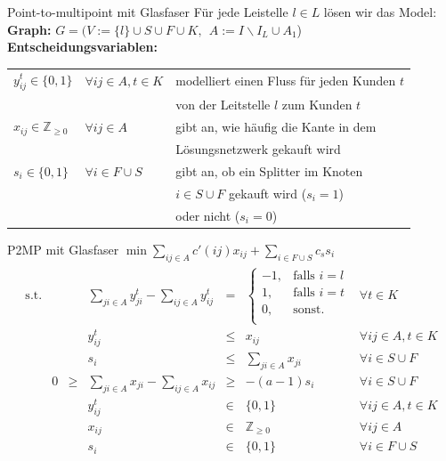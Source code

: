 \documentclass{beamer}
\newcommand{\Z}{\mathbb{Z}}
\begin{document}
		
	\begin{frame}{Point-to-multipoint mit Glasfaser}
	F\"ur jede Leistelle $l \in L$ l\"osen wir das Model: \\
	\vspace{0.2cm}
	\textbf{Graph:}  $G=(V:=\{l\}\cup S \cup F \cup K ,\: \:   A:= I\backslash I_L \cup A_1$)\\
	\vspace{0.2cm}
	\textbf{Entscheidungsvariablen:}\\
	\begin{tabular}{lll}
			$y_{ij}^t \in \{0,1\}$ &$\forall ij \in A, t\in K $ & modelliert einen Fluss für jeden Kunden $t$ \\
			&&von der Leitstelle $l$ zum Kunden $t$\\
			$x_{ij} \in \Z_{\geq 0}$ & $\forall ij \in A$ &gibt an, wie häufig die Kante in dem \\
			&&Lösungsnetzwerk gekauft wird\\
			$s_i \in \{0,1\}$ & $\forall i \in F \cup S$ & gibt an, ob ein Splitter im Knoten \\
			&&$i\in S \cup F$ gekauft wird ($s_i=1$)\\
			 &&oder nicht ($s_i=0$)
	\end{tabular}

\end{frame}
	
	\begin{frame}{P2MP mit Glasfaser}
	 $\min \displaystyle\sum_{ij \in A} c'(ij) x_{ij} + \displaystyle\sum_{i \in F \cup S} c_s s_i $
	\begin{align*}
\begin{array}{rcrcrcl}
\textrm{s.t.}  
&& &\displaystyle\sum_{ji \in A} y_{ji}^t - \displaystyle\sum_{ij \in A} y_{ij}^t& = & \left\{\begin{array}{cl} 
-1, & \text{falls } i=l\\ 
1, & \text{falls } i=t\\ 
0, & \text{sonst.}\\ 
\end{array}
\right. & \forall t \in K\\
&&& y_{ij}^t & \leq & x_{ij} & \forall ij \in A, t\in K \\
&&& s_i &\leq& \displaystyle\sum_{ji \in A} x_{ji}& \forall  i \in S \cup F\\ 
&0&\geq&\displaystyle\sum_{ji \in A} x_{ji} - \displaystyle\sum_{ij \in A} x_{ij}&\geq& -(a-1)s_i & \forall i \in S \cup F\\
&&& y_{ij}^t & \in & \{0,1 \}& \forall ij \in A, t \in K \\
&&& x_{ij} & \in & \Z_{\geq 0} & \forall ij \in A\\
&&& s_i & \in & \{ 0,1 \} & \forall i \in F \cup S \\
\end{array}
\end{align*}
\end{frame}
\end{document}
